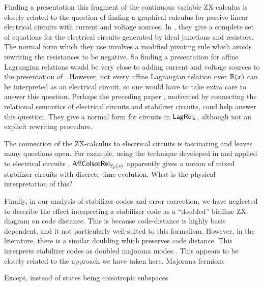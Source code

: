 Finding a presentation this fragment of the  continuous variable ZX-calculus is closely related to the question of finding a graphical calculus for passive linear electrical circuits with current and voltage sources.  In \cite{amolak}, they give a complete set of equations for the electrical circuits generated by ideal junctions and resistors.  The normal form which they use involves a modified pivoting rule which avoids rewriting the resistances to be negative.  
  So finding a presentation for affine Lagrangian relations would be very close to adding current and voltage sources to the presentation of \cite{amolak}. However, not every affine Lagrangian relation over $\mathbb{R}(x)$ can be interpreted as an electrical circuit, so one would have to take extra care to answer this question. Perhaps the preceding paper \nocite{kirch}, motivated by connecting the relational semantics of electrical circuits and stabilizer circuits, coud help answer this question. They give a normal form for circuits in $\mathsf{Lag}\mathsf{Rel}_k$, although not an explicit rewriting procedure.

The connection of the ZX-calculus to electrical circuits is fascinating and leaves many questions open.  For example, using the technique developed in \cite{control} and applied to electrical circuits \cite{network}, $\mathsf{Aff}{\sf Co}{\sf Isot}\mathsf{Rel}_{\mathbb{F}_p(s)}$ apparently gives a notion of mixed stabilizer circuits with discrete-time evolution.  What is the physical interpretation of this?




Finally, in our analysis of stabilizer codes and error correction, we have neglected to describe the effect interpreting a stabilizer code as a ``doubled'' biaffine ZX-diagram on code distance.  This is because code-distance is highly basis dependent, and it not particularly well-suited to this formalism.  However, in the literature, there is a similar doubling which preserves code distance.  This  interprets stabilizer codes as doubled majorana modes \cite{majorcodes}.  This appears to be closely related to the approach we have taken here.  Majorana fermions  


 Except, instead of states being coisotropic subspaces


%
%
%
%
%
%
%
%
%
%

